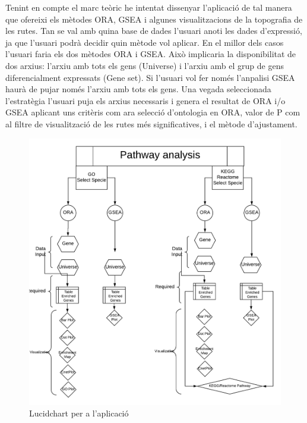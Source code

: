 Tenint en compte el marc teòric he intentat dissenyar l'aplicació de tal manera que ofereixi els mètodes \gls{ORA}, \gls{GSEA} i algunes visualitzacions de la topografia de les rutes. Tan se val amb quina base de dades l'usuari anoti les dades d'expressió, ja que l'usuari podrà decidir quin mètode vol aplicar. En el millor dels casos l'usuari faria els dos mètodes ORA i GSEA. Això implicaria la disponibilitat de dos arxius: l'arxiu amb tots els gens (Universe) i l'arxiu amb el grup de gens diferencialment expressats (Gene set). Si l'usuari vol fer només l'anpalisi \gls{GSEA} haurà de pujar només l'arxiu amb tots els gens. Una vegada seleccionada l'estratègia l'usuari puja els arxius necessaris i genera el resultat de \gls{ORA} i/o \gls{GSEA} aplicant uns critèris com ara selecció d'ontologia en ORA, valor de P com al filtre de visualització de les rutes més significatives, i el mètode d'ajustament.

\begin{figure}[H]
\centering
\includegraphics[width=.9\textwidth]{figures/LucidChart} 
\caption{Lucidchart per a l'aplicació}
\end{figure}

